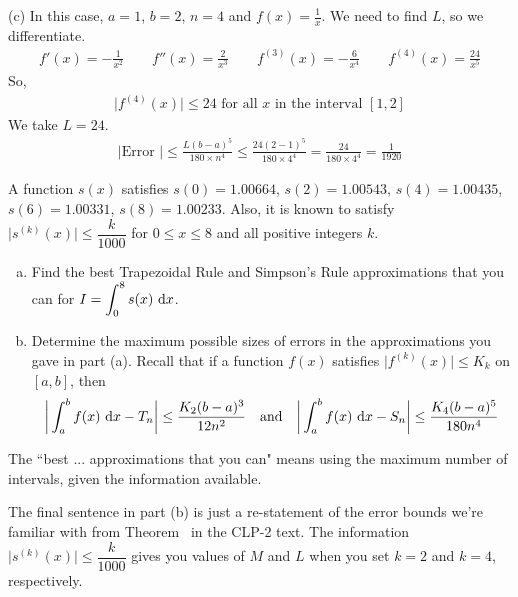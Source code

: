 \begin{solution}
\noindent (c)
In this case, $a=1$, $b=2$,
$n=4$ and $f(x)=\frac{1}{x}$. We need to find $L$, so we differentiate.
\begin{align*}
f'(x)=-\frac{1}{x^2}\qquad
f''(x)=\frac{2}{x^3}\qquad
f^{(3)}(x)=-\frac{6}{x^4}\qquad
f^{(4)}(x)=\frac{24}{x^5}
\end{align*}
So,
\begin{align*}
\big|f^{(4)}(x)\big|\le 24\text{ for all }x\text{ in the interval } [1,2]
\end{align*}
We take $L=24$.
\begin{align*}
|\text{Error }|\le \frac{L(b-a)^5}{180\times n^4}
\le \frac{24(2-1)^5}{180\times 4^4}=\frac{24}{180\times 4^4}=\frac{1}{1920}
\end{align*}


\end{solution}


\begin{question}[M121 2000A]\label{prob_s.1.11_error2}
A function $s(x)$ satisfies $s(0)=1.00664$, $s(2)=1.00543$,
$s(4)=1.00435$, $s(6)=1.00331$, $s(8)=1.00233$. Also, it is known to satisfy
$\big|s^{(k)}(x)\big|\le \dfrac{k}{1000}$ for $0\le x\le 8$ and all positive
integers $k$.

\begin{enumerate}[(a)]
\item
Find the best Trapezoidal Rule and Simpson's Rule approximations
that you can for $\displaystyle I=\int_0^8 s(x)\ \mathrm{d}x$.

\item
Determine the maximum possible sizes of errors in the approximations
you gave in part (a). Recall that if a function $f(x)$ satisfies
$\big|f^{(k)}(x)\big|\le K_k$ on $[a,b]$, then
\begin{equation*}
\bigg|\int_a^b f(x)\ \mathrm{d}x -T_n\bigg|\le \frac{K_2(b-a)^3}{12n^2}
\quad\hbox{and}\quad
\bigg|\int_a^b f(x)\ \mathrm{d}x -S_n\bigg|\le \frac{K_4(b-a)^5}{180n^4}
\end{equation*}
\end{enumerate}
\end{question}

\begin{hint}
The ``best ... approximations that you can" means using the maximum number of intervals, given the information available.

The final sentence in part (b) is just a re-statement of the error bounds we're familiar with from Theorem~ in the CLP-2 text. The information $\big|s^{(k)}(x)\big|\le \dfrac{k}{1000}$ gives you values of $M$ and $L$ when you set $k=2$ and $k=4$, respectively.
\end{hint}

